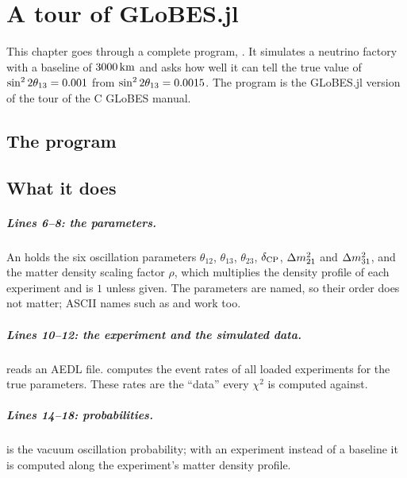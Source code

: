 \chapter{A tour of GLoBES.jl}\label{ch:tour}

This chapter goes through a complete program, . It
simulates a neutrino factory with a baseline of $3000\,\mathrm{km}$ and asks how well it
can tell the true value of $\sin^2 2\theta_{13}=0.001$ from $\sin^2 2\theta_{13}=0.0015$. The program
is the GLoBES.jl version of the tour of the C GLoBES manual.

\section{The program}


\section{What it does}

\paragraph{Lines 6--8: the parameters.} An  holds the six
oscillation parameters $\theta_{12}$, $\theta_{13}$, $\theta_{23}$, $\delta_\mathrm{CP}$,
$\Delta m^2_{21}$ and $\Delta m^2_{31}$, and the matter density scaling factor $\rho$, which
multiplies the density profile of each experiment and is $1$ unless given.
The parameters are named, so their order does not matter; ASCII names such as
 and  work too.

\paragraph{Lines 10--12: the experiment and the simulated data.}
 reads an AEDL file.  computes the event rates
of all loaded experiments for the true parameters. These rates are the
``data'' every $\chi^2$ is computed against.

\paragraph{Lines 14--18: probabilities.} 
is the vacuum oscillation probability; with an experiment instead of a
baseline it is computed along the experiment's matter density profile.

